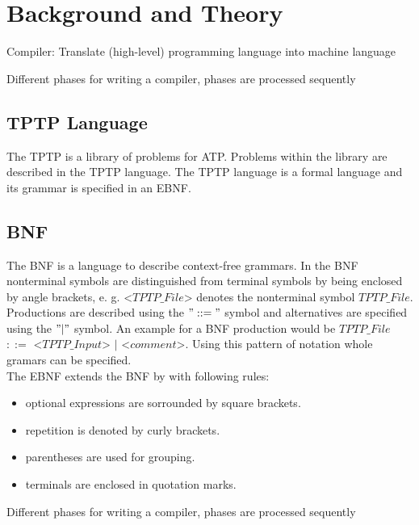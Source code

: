 
\chapter{Background and Theory}\label{cha:Background}



\cite{Mogensen.2017}
Compiler: Translate (high-level) programming language into machine language

Different phases for writing a compiler, phases are processed sequently
\section{TPTP Language}\label{sec:BackgroundTPTP}
The \acf{TPTP} is a library of problems for \ac{ATP}.
Problems within the library are described in the \ac{TPTP} language.
The  \ac{TPTP} language is a formal language and its grammar is specified in an \ac{EBNF}. \cite{Sut17}\\

\section{\acf{BNF}}\label{sec:BackgroundBNF}
The  \acf{BNF} is a language to describe context-free grammars.
In the \acf{BNF} nonterminal symbols are distinguished from terminal symbols by being enclosed by  angle brackets, e. g. <$TPTP\_File$> denotes the nonterminal symbol $TPTP\_File$.
Productions are described using the $"::="$ symbol and alternatives are specified using the $"|"$ symbol.
An example for a \ac{BNF} production would be $TPTP\_File$ $::=$ <$TPTP\_Input$> $|$ <$comment$>. \cite{BNF.1964} 
Using this pattern of notation whole gramars can be specified.\\
The \ac{EBNF} extends the \ac{BNF} by with following rules:

\begin{itemize}%
	\item optional expressions are sorrounded by square brackets.
	\item repetition is denoted by curly brackets.
	\item parentheses are used for grouping.
	\item terminals are enclosed in quotation marks.
\end{itemize}
\label{itemize:BackgroundBNF}
\cite{EBNF.1977}


Different phases for writing a compiler, phases are processed sequently

